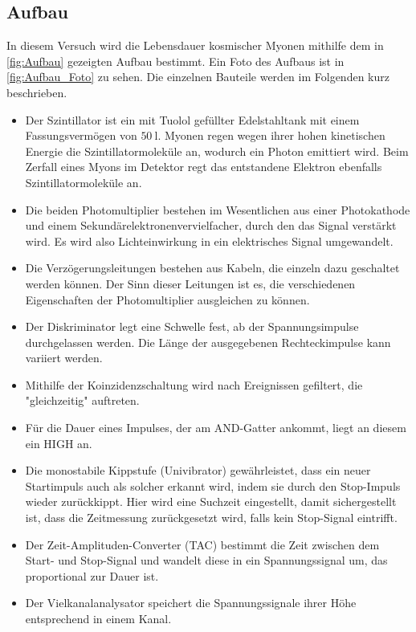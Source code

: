 \subsection{Aufbau}
In diesem Versuch wird die Lebensdauer kosmischer Myonen mithilfe dem in \autoref{fig:Aufbau} gezeigten Aufbau bestimmt. Ein Foto des Aufbaus ist in \autoref{fig:Aufbau_Foto} zu sehen. Die einzelnen Bauteile werden im Folgenden kurz beschrieben.
\begin{itemize}
    \item Der Szintillator ist ein mit Tuolol gefüllter Edelstahltank mit einem Fassungsvermögen von $\SI{50}{\litre}$. Myonen regen wegen ihrer hohen kinetischen Energie die Szintillatormoleküle an, wodurch ein Photon emittiert wird. Beim Zerfall eines Myons im Detektor regt das entstandene Elektron ebenfalls Szintillatormoleküle an.
    \item Die beiden Photomultiplier bestehen im Wesentlichen aus einer Photokathode und einem Sekundärelektronenvervielfacher, durch den das Signal verstärkt wird. Es wird also Lichteinwirkung in ein elektrisches Signal umgewandelt.
    \item Die Verzögerungsleitungen bestehen aus Kabeln, die einzeln dazu geschaltet werden können. Der Sinn dieser Leitungen ist es, die verschiedenen Eigenschaften der Photomultiplier ausgleichen zu können.
    \item Der Diskriminator legt eine Schwelle fest, ab der Spannungsimpulse durchgelassen werden. Die Länge der ausgegebenen Rechteckimpulse kann variiert werden.
    \item Mithilfe der Koinzidenzschaltung wird nach Ereignissen gefiltert, die "gleichzeitig" auftreten. 
    \item Für die Dauer eines Impulses, der am AND-Gatter ankommt, liegt an diesem ein HIGH an. %
    \item Die monostabile Kippstufe (Univibrator) gewährleistet, dass ein neuer Startimpuls auch als solcher erkannt wird, indem sie durch den Stop-Impuls wieder zurückkippt. Hier wird eine Suchzeit eingestellt, damit sichergestellt ist, dass die Zeitmessung zurückgesetzt wird, falls kein Stop-Signal eintrifft. %
    \item Der Zeit-Amplituden-Converter (TAC) bestimmt die Zeit zwischen dem Start- und Stop-Signal und wandelt diese in ein Spannungssignal um, das proportional zur Dauer ist.
    \item Der Vielkanalanalysator speichert die Spannungssignale ihrer Höhe entsprechend in einem Kanal.
\end{itemize}
